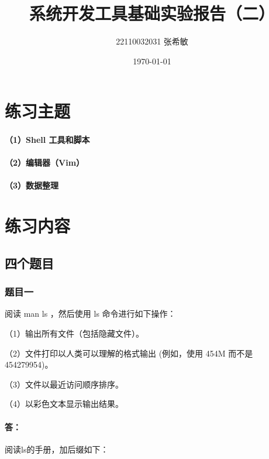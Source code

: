 \documentclass[a4paper, 12pt]{article}
\begin{document}
	\title{系统开发工具基础实验报告（二）}
	\author{22110032031 张希敏}
	\date{\today}
	\maketitle
	
	\tableofcontents
	\newpage
	
	\section{练习主题}
	\paragraph{（1）Shell 工具和脚本}
	
	\paragraph{（2）编辑器（Vim）}
	
	\paragraph{（3）数据整理}
	
	\section{练习内容}
	
	\subsection{四个题目}
	
	\subsubsection{题目一}
	阅读 man ls ，然后使用 ls 命令进行如下操作：
	
	（1）输出所有文件（包括隐藏文件）。
	
	（2）文件打印以人类可以理解的格式输出 (例如，使用 454M 而不是 454279954)。
	
	（3）文件以最近访问顺序排序。
	
	（4）以彩色文本显示输出结果。
	
	\paragraph{答：}
	阅读ls的手册，加后缀如下：
	
\end{document}
